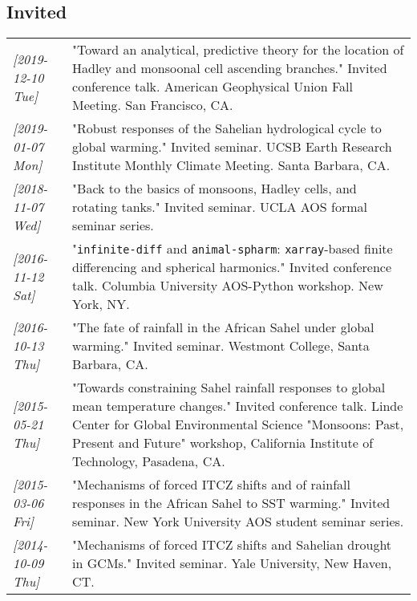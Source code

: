 \documentclass[12pt,letterpaper]{shillcv}
\begin{document}
\subsection*{Invited}
\label{sec:org1bd8819}
\begin{center}
\begin{tabularx}{\textwidth}{lX}
\textit{[2019-12-10 Tue]} & "Toward an analytical, predictive theory for the location of Hadley and monsoonal cell ascending branches."  Invited conference talk.  American Geophysical Union Fall Meeting.  San Francisco, CA.\\
\textit{[2019-01-07 Mon]} & "Robust responses of the Sahelian hydrological cycle to global warming."  Invited seminar.  UCSB Earth Research Institute Monthly Climate Meeting.  Santa Barbara, CA.\\
\textit{[2018-11-07 Wed]} & "Back to the basics of monsoons, Hadley cells, and rotating tanks."  Invited seminar.  UCLA AOS formal seminar series.\\
\textit{[2016-11-12 Sat]} & "\texttt{infinite-diff} and \texttt{animal-spharm}: \texttt{xarray}-based finite differencing and spherical harmonics."  Invited conference talk.  Columbia University AOS-Python workshop.  New York, NY.\\
\textit{[2016-10-13 Thu]} & "The fate of rainfall in the African Sahel under global warming."  Invited seminar.  Westmont College, Santa Barbara, CA.\\
\textit{[2015-05-21 Thu]} & "Towards constraining Sahel rainfall responses to global mean temperature changes."  Invited conference talk.  Linde Center for Global Environmental Science "Monsoons: Past, Present and Future" workshop, California Institute of Technology, Pasadena, CA.\\
\textit{[2015-03-06 Fri]} & "Mechanisms of forced ITCZ shifts and of rainfall responses in the African Sahel to SST warming."  Invited seminar.  New York University AOS student seminar series.\\
\textit{[2014-10-09 Thu]} & "Mechanisms of forced ITCZ shifts and Sahelian drought in GCMs."  Invited seminar.  Yale University, New Haven, CT.\\
\end{tabularx}
\end{center}
\end{document}
